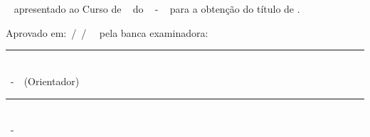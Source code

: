 
%    


\begin{folhadeaprovacao}

\begin{center}
    \large { \imprimirautor}  \\
		\vspace{3cm} 
		\large {\textbf{\MakeTextUppercase{\imprimirtitulo}}~\MakeTextLowercase{\imprimirsubtitulo}}
    \end{center}
    \vspace{2cm}
    \begin{flushright} 
    \parbox{0.6\linewidth}{
		\imprimirtipotrabalho~ apresentado ao Curso de \imprimircurso~ do \imprimirinstituicao~ - \imprimirinstituto~ para a obtenção do título de \imprimirgrau. \\
		}
   \end{flushright} 
   \vfill
 
   \begin{center}
   \large{
   Aprovado em:~\imprimirdia /\ \imprimirmes/\ \imprimirano~ pela banca examinadora:
    \vspace{2cm}
    \vfill
          \rule{15cm}{.1pt} \\
      {\imprimirorientador}~-~{\imprimirttorientador}~(Orientador) 
      \vfill
			 \vfill
      \rule{15cm}{.1pt} \\
      {\imprimirexaminadorum}~-~{\imprimirttexaminadorum} %
        \vfill
        \ifdefvoid{\imprimirexaminadordois}{}{
        \rule{15cm}{.1pt} \\
        \imprimirexaminadordois~-~\imprimirttexaminadordois %
        }
				\vfill
        \ifdefvoid{\imprimirexaminadortres}{}{
        \rule{15cm}{.1pt} \\
        \imprimirexaminadortres~-~\imprimirttexaminadortres %
        }
				\vfill
        \ifdefvoid{\imprimirexaminadorquatro}{}{
        \rule{15cm}{.1pt} \\
        \imprimirexaminadorquatro~-~\imprimirttexaminadorquatro %
        }
   
}
\end{center}
\end{folhadeaprovacao}
